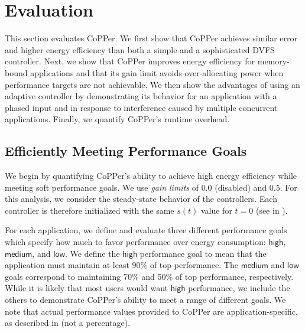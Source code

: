 \section{Evaluation}
\label{sec:copper-evaluation}

This section evaluates CoPPer.
We first show that CoPPer achieves similar error and higher energy efficiency than both a simple and a sophisticated DVFS controller.
Next, we show that CoPPer improves energy efficiency for memory-bound applications and that its gain limit avoids over-allocating power when performance targets are not achievable.
We then show the advantages of using an adaptive controller by demonstrating its behavior for an application with a phased input and in response to interference caused by multiple concurrent applications.
Finally, we quantify CoPPer's runtime overhead.


\subsection{Efficiently Meeting Performance Goals}
\label{sec:copper-eval-perf}

We begin by quantifying CoPPer's ability to achieve high energy efficiency while meeting soft performance goals.
We use \emph{gain limits} of $0.0$ (disabled) and $0.5$.
For this analysis, we consider the steady-state behavior of the controllers.
Each controller is therefore initialized with the same $s(t)$ value for $t=0$ (see  in ).

For each application, we define and evaluate three different performance goals which specify how much to favor performance over energy consumption: $\mathsf{high}$, $\mathsf{medium}$, and $\mathsf{low}$.
We define the $\mathsf{high}$ performance goal to mean that the application must maintain at least 90\% of top performance.
The $\mathsf{medium}$ and $\mathsf{low}$ goals correspond to maintaining 70\% and 50\% of top performance, respectively.
While it is likely that most users would want $\mathsf{high}$ performance, we include the others to demonstrate CoPPer's ability to meet a range of different goals.
We note that actual performance values provided to CoPPer are application-specific, as described in  (\ie not a percentage).

